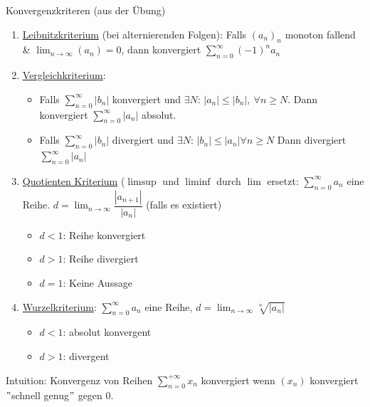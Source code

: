 \documentclass[a4paper,10pt]{article}
\begin{document}
\begin{tbox}
    {Konvergenzkriteren (aus der Übung)}
    \begin{enumerate}
        \item \underline{Leibnitzkriterium} (bei alternierenden Folgen): Falls $(a_n)_n$ monoton fallend \& $\lim_{n\to \infty}(a_n)=0$, dann konvergiert $\sum_{n=0}^\infty(-1)^na_n$
        \item \underline{Vergleichkriterium}: 
        \begin{itemize}
            \item Falls $\sum_{n=0}^\infty|b_n|$ konvergiert und $\exists N$: $|a_n|\le|b_n|,\ \forall n\ge N$. Dann konvergiert $\sum_{n=0}^\infty|a_n|$ absolut.
            \item Falls $\sum_{n=0}^\infty|b_n|$ divergiert und $\exists N$: $|b_n|\le|a_n|\forall n \ge N$ Dann divergiert $\sum_{n=0}^\infty|a_n|$
        \end{itemize}
        \item \underline{Quotienten Kriterium} ($\limsup$ und $\liminf$ durch $\lim$ ersetzt: $\sum_{n=0}^\infty a_n$ eine Reihe. $d=\lim_{n\to\infty}\dfrac{|a_{n+1}|}{|a_n|}$ (falls es existiert)
        \begin{itemize}
            \item $d<1$: Reihe konvergiert
            \item $d>1$: Reihe divergiert
            \item $d=1$: Keine Aussage
        \end{itemize}
        \item \underline{Wurzelkriterium}: $\sum_{n=0}^\infty a_n$ eine Reihe, $d=\lim_{n\to\infty}\sqrt[n]{|a_n|}$
        \begin{itemize}
            \item $d<1$: absolut konvergent
            \item $d>1$: divergent
        \end{itemize}
    \end{enumerate}
\end{tbox}
\begin{tipbox}
    {Intuition: Konvergenz von Reihen}
    $\sum_{n=0}^{+\infty}x_n$ konvergiert wenn $ (x_n)$ konvergiert $"$schnell genug$"$ gegen $0$.
\end{tipbox}
\end{document}
